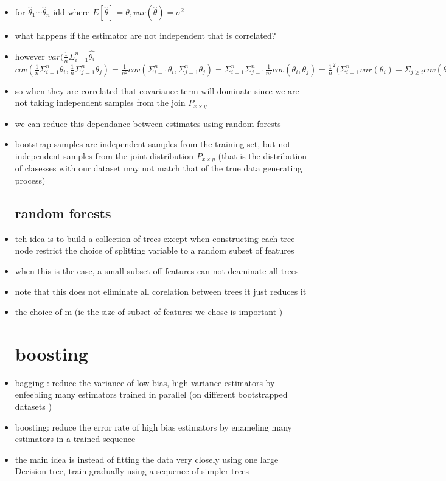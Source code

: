 \documentclass{article}
\begin{document}
\begin{itemize}
\subsection*{correlated predictions}
\item for $\hat{\theta}_1\cdots \hat{\theta}_n$ idd where $E[\hat{\theta}]=\theta, var(\hat{\theta})=\sigma^{2}$
\item what happens if the estimator are not independent that is correlated?
\item  however $var(\frac{1}{n}\Sigma_{i=1}^{n}\hat{\theta_i}=$ $cov(\frac{1}{n}\Sigma_{i=1}^{n}\theta_i,\frac{1}{n}\Sigma_{j=1}^{n}\theta_j)=\frac{1}{n^2}cov(\Sigma_{i=1}^{n}\theta_i,\Sigma_{j=1}^{n}\theta_j)=\Sigma_{i=1}^{n}\Sigma_{j=1}^{n}\frac{1}{n^2}cov(\theta_i,\theta_j)=\frac{1}{n}^2(\Sigma_{i=1}^{n}var(\theta_i)+\Sigma_{j\geq i}cov(\theta_i, \theta_j)=\frac{\sigma^2}{n}+\frac{1}{n^2}\Sigma_{i=1}^{n}\Sigma_{j\geq i}cov(\theta_i, \theta_j)$
\item so when they are correlated that covariance term will dominate since we are not taking independent samples from the join $P_{x\times y}$
\item we can reduce this dependance between estimates using random forests
\item bootstrap samples are independent samples from the training set, but not independent samples from the joint distribution $P_{x\times y}$ (that is the distribution of clasesses with our dataset may not match that of the true data generating process)
\subsection*{random forests}
\item teh idea is to build a collection of trees except when constructing  each tree node restrict the choice of splitting variable to a random subset of features 
\item when this is the case, a small subset off features can not deaminate all trees  
\item note that this does not eliminate all corelation between trees it just reduces it  
\item the choice of m (ie the size of subset of features we chose is important )
\section*{boosting }
\item bagging : reduce the variance of low bias, high variance estimators by enfeebling many estimators trained in parallel (on different bootstrapped datasets ) 
\item boosting: reduce the error rate of high bias estimators by enameling many estimators in a trained sequence
\item the main  idea is instead of fitting the data very closely using  one large Decision tree, train gradually using a sequence of simpler trees 

\end{itemize}
\end{document}
